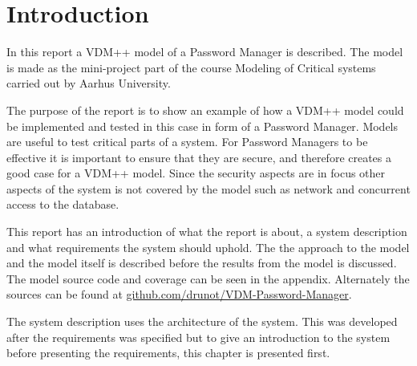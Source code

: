 \chapter{Introduction}

In this report a VDM++ model of a Password Manager is described. The model is made as the mini-project part of the course Modeling of Critical systems carried out by Aarhus University.

The purpose of the report is to show an example of how a VDM++ model could be implemented and tested in this case in form of a Password Manager. Models are useful to test critical parts of a system. For Password Managers to be effective it is important to ensure that they are secure, and therefore creates a good case for a VDM++ model. Since the security aspects are in focus other aspects of the system is not covered by the model such as network and concurrent access to the database.

This report has an introduction of what the report is about, a system description and what requirements the system should uphold. The the approach to the model and the model itself is described before the results from the model is discussed. The model source code and coverage can be seen in the appendix. Alternately the sources can be found at \href{https://github.com/drunot/VDM-Password-Manager}{github.com/drunot/VDM-Password-Manager}.

The system description uses the architecture of the system. This was developed after the requirements was specified but to give an introduction to the system before presenting the requirements, this chapter is presented first.